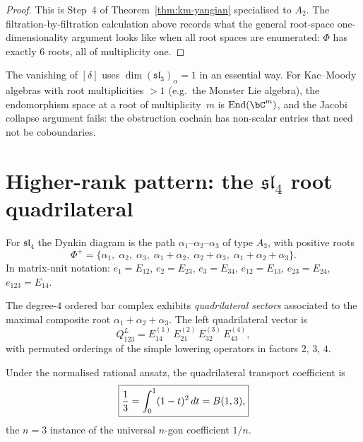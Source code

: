 \begin{proof}
This is Step~4 of Theorem~\ref{thm:km-yangian} specialised to
$A_2$. The filtration-by-filtration calculation above records
what the general root-space one-dimensionality argument looks like
when all root spaces are enumerated: $\Phi$ has exactly $6$ roots,
all of multiplicity one.
\end{proof}

\begin{remark}
\label{rem:root-multiplicities}
The vanishing of $[\delta]$ uses $\dim(\mathfrak{sl}_3)_\alpha=1$
in an essential way. For Kac--Moody algebras with root multiplicities
$>1$ (e.g.\ the Monster Lie algebra), the endomorphism space at a
root of multiplicity~$m$ is $\operatorname{End}(\bC^m)$, and
the Jacobi collapse argument fails: the obstruction cochain has
non-scalar entries that need not be coboundaries.
\end{remark}


\section{Higher-rank pattern: the \texorpdfstring{$\mathfrak{sl}_4$}{sl(4)} root quadrilateral}
\label{sec:sl4-quadrilateral}

For $\mathfrak{sl}_4$ the Dynkin diagram is the path
$\alpha_1\text{--}\alpha_2\text{--}\alpha_3$ of type $A_3$, with
positive roots
\[
\Phi^+=\{\alpha_1,\;\alpha_2,\;\alpha_3,\;
\alpha_1{+}\alpha_2,\;\alpha_2{+}\alpha_3,\;
\alpha_1{+}\alpha_2{+}\alpha_3\}.
\]
In matrix-unit notation: $e_1=E_{12}$, $e_2=E_{23}$, $e_3=E_{34}$,
$e_{12}=E_{13}$, $e_{23}=E_{24}$, $e_{123}=E_{14}$.

\begin{definition}
\label{def:sl4-quadrilateral}
The degree-$4$ ordered bar complex exhibits \emph{quadrilateral sectors}
associated to the maximal composite root $\alpha_1+\alpha_2+\alpha_3$.
The left quadrilateral vector is
\[
Q^L_{123}
=E_{14}^{(1)}\,E_{21}^{(2)}\,E_{32}^{(3)}\,E_{43}^{(4)},
\]
with permuted orderings of the simple lowering operators in
factors $2$, $3$, $4$.
\end{definition}

\begin{theorem}
\label{thm:sl4-quadrilateral}
Under the normalised rational ansatz, the quadrilateral transport
coefficient is
\[
\boxed{%
\frac{1}{3}
=
\int_0^1(1-t)^2\,dt
=
B(1,3),
}
\]
the $n=3$ instance of the universal $n$-gon coefficient $1/n$.
\end{theorem}

